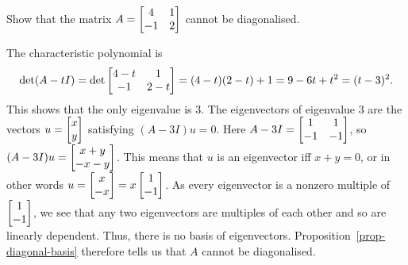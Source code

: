 \documentclass[a4paper]{amsart}
\renewenvironment{solution}{\SolutionInline}{\endSolutionInline}
\begin{document}
\begin{exercise}\label{ex-diagonal-ii}
 Show that the matrix $A=\left[\begin{matrix} 4 & 1 \\ -1 & 2\end{matrix}\right]$ cannot be
 diagonalised. 
\end{exercise}
\begin{solution}
 The characteristic polynomial is 
 \[ \det(A-tI) = \det\left[\begin{matrix} 4-t & 1 \\ -1 & 2-t \end{matrix}\right] =
     (4-t)(2-t)+1 = 9 - 6t + t^2 = (t-3)^2.
 \]
 This shows that the only eigenvalue is $3$.  The eigenvectors of
 eigenvalue $3$ are the vectors $u=\left[\begin{matrix} x\\y\end{matrix}\right]$ satisfying
 $(A-3I)u=0$.  Here $A-3I=\left[\begin{matrix} 1&1\\-1&-1\end{matrix}\right]$, so
 $(A-3I)u=\left[\begin{matrix} x+y\\-x-y\end{matrix}\right]$.  This means that $u$ is an eigenvector
 iff $x+y=0$, or in other words $u=\left[\begin{matrix} x\\-x\end{matrix}\right]=x\left[\begin{matrix} 1\\-1\end{matrix}\right]$.
 As every eigenvector is a nonzero multiple of $\left[\begin{matrix} 1\\ -1\end{matrix}\right]$, we
 see that any two eigenvectors are multiples of each other and so are
 linearly dependent.  Thus, there is no basis of eigenvectors.
 Proposition~\ref{prop-diagonal-basis} therefore tells us that $A$
 cannot be diagonalised.
\end{solution}
\end{document}
